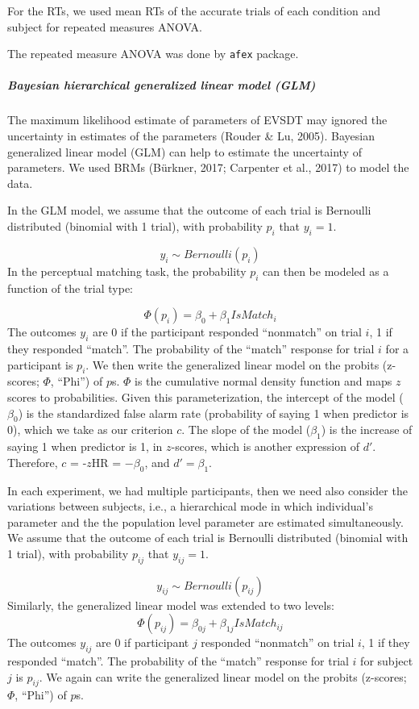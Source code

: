 \documentclass[
  english,
  man]{apa6}
\let\oldsubparagraph\subparagraph
\renewcommand{\subparagraph}[1]{\oldsubparagraph{#1}\mbox{}}
\begin{document}
For the RTs, we used mean RTs of the accurate trials of each condition and subject for repeated measures ANOVA.

The repeated measure ANOVA was done by \texttt{afex} package.

\hypertarget{bayesian-hierarchical-generalized-linear-model-glm}{%
\subparagraph{Bayesian hierarchical generalized linear model (GLM)}\label{bayesian-hierarchical-generalized-linear-model-glm}}

The maximum likelihood estimate of parameters of EVSDT may ignored the uncertainty in estimates of the parameters (Rouder \& Lu, 2005). Bayesian generalized linear model (GLM) can help to estimate the uncertainty of parameters. We used BRMs (Bürkner, 2017; Carpenter et al., 2017) to model the data.

In the GLM model, we assume that the outcome of each trial is Bernoulli distributed (binomial with 1 trial), with probability \(p_{i}\) that \(y_{i} = 1\).

\[ y_{i} \sim Bernoulli(p_{i})\]
In the perceptual matching task, the probability \(p_{i}\) can then be modeled as a function of the trial type:

\[ \Phi(p_{i}) =  \beta_{0} + \beta_{1}IsMatch_{i}\]
The outcomes \(y_{i}\) are 0 if the participant responded \enquote{nonmatch} on trial \(i\), 1 if they responded \enquote{match}. The probability of the \enquote{match} response for trial \(i\) for a participant is \(p_{i}\). We then write the generalized linear model on the probits (z-scores; \(\Phi\), \enquote{Phi}) of \(p\)s. \(\Phi\) is the cumulative normal density function and maps \(z\) scores to probabilities. Given this parameterization, the intercept of the model (\(\beta_0\)) is the standardized false alarm rate (probability of saying 1 when predictor is 0), which we take as our criterion \(c\). The slope of the model (\(\beta_1\)) is the increase of saying 1 when predictor is 1, in \(z\)-scores, which is another expression of \(d'\). Therefore, \(c\) = -\(z\)HR = \(-\beta_0\), and \(d' = \beta_1\).

In each experiment, we had multiple participants, then we need also consider the variations between subjects, i.e., a hierarchical mode in which individual's parameter and the the population level parameter are estimated simultaneously. We assume that the outcome of each trial is Bernoulli distributed (binomial with 1 trial), with probability \(p_{ij}\) that \(y_{ij} = 1\).

\[ y_{ij} \sim Bernoulli(p_{ij})\]
Similarly, the generalized linear model was extended to two levels:
\[ \Phi(p_{ij}) =  \beta_{0j} + \beta_{1j}IsMatch_{ij}\]
The outcomes \(y_{ij}\) are 0 if participant \(j\) responded \enquote{nonmatch} on trial \(i\), 1 if they responded \enquote{match}. The probability of the \enquote{match} response for trial \(i\) for subject \(j\) is \(p_{ij}\). We again can write the generalized linear model on the probits (z-scores; \(\Phi\), \enquote{Phi}) of \(p\)s.
\end{document}
